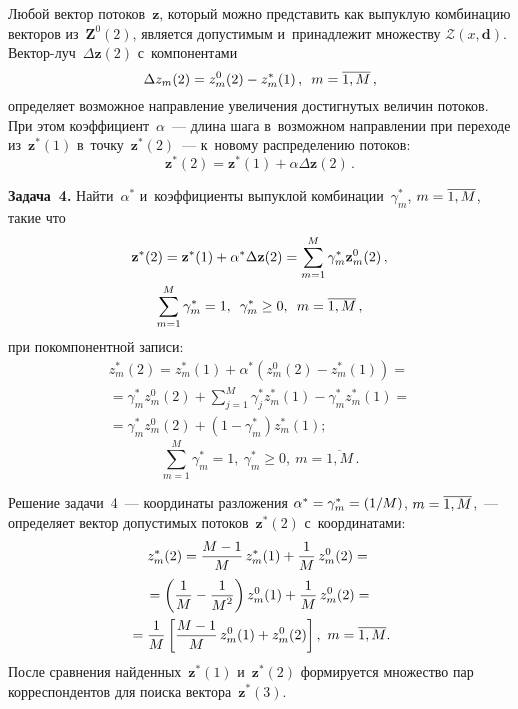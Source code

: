 \begin{multicols}{2}
Любой вектор потоков~$\mathbf{z}$, который можно представить 
как выпуклую комбинацию векторов из~$\mathbf{Z}^0(2)$, 
является допустимым и~принадлежит множеству $\mathcal{Z}(x, \mathbf{d})$.
Век\-тор-луч~$\Delta \mathbf{z}(2)$ с~компонентами 
$$
\Delta z_m(2) = 
z_m^0 (2) - z_m^*(1)\,,\enskip m = \overline {1, M}\,, 
$$
определяет возможное направление увеличения достигнутых величин потоков. 
При этом коэффициент~$\alpha$~--- длина шага в~возможном направлении 
при переходе из~$\mathbf{z}^*(1)$ в~точку~$\mathbf{z}^*(2)$~--- к~новому 
распределению потоков:
$$
 \mathbf{z}^*(2) = \mathbf{z}^*(1) + \alpha \Delta \mathbf{z}(2)\,.
 $$


\noindent
\textbf{Задача~4.} Найти~$\alpha^*$ и~коэффициенты выпуклой 
комбинации~$\gamma_m^*$,  $m \hm= \overline {1, M}$, такие что
\begin{multline*}
\mathbf{z}^*(2) = \mathbf{z}^*(1) + \alpha^* \Delta \mathbf{z}(2) = 
\sum\limits_{m=1}^M \gamma_m^* \mathbf{z}_m^0(2)\,, 
\\
  \sum\limits_{m=1}^M \gamma_m^* = 1, \enskip  \gamma_m^* \ge 0,  \enskip 
  m = \overline {1, M}\,,
\end{multline*}
при покомпонентной записи:
\begin{multline*} 
{z}_m^*(2) = z_m^*(1) + \alpha^*\left( z_m^0(2)  -  z_m^*(1)\right) = {}\\
{}=
\gamma_m^* z_m^0(2) + \sum\limits_{j=1}^M \gamma_j^* z_m^*(1)  - 
\gamma_m^* {z}_m^*(1) = {}\\
{}  = \gamma_m^* z_m^0(2) + 
\left(1 - \gamma_m^*\right) {z}_m^*(1);
\end{multline*}
$$  
\sum\limits_{m=1}^M \gamma_m^* = 1, \  \gamma_m^* \ge 0, \ 
 m = \overline {1, M}\,.
 $$

Решение задачи~4~--- координаты разложения $\alpha^* \hm= \gamma_m^* 
\hm= ({1}/{M})$, $ m \hm= \overline {1, M}$,~--- 
определяет вектор допустимых потоков~$\mathbf{z}^*(2)$ с~координатами:
\begin{multline*}
z_m^*(2) = \fr{M - 1}{M}\, z_m^*(1) + \fr{1}{M}\, z_m^0(2) = {}\\
{}=
\left(\fr{1}{M} - \fr{1}{M^2}\right) z_m^0(1) + \fr{1}{M} \,z_m^0(2) = {}\\
{} = \fr{1}{M} \left[\fr{M - 1}{M} \,z_m^0(1) + z_m^0(2) \right],  \ 
m = \overline {1, M}.
\end{multline*}
После сравнения найденных~$\mathbf{z}^*(1)$ и~$\mathbf{z}^*(2)$ 
формируется множество пар корреспондентов для поиска вектора~$\mathbf{z}^*(3)$.


\end{multicols}

